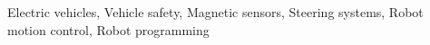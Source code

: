 \begin{keywords}
Electric vehicles, Vehicle safety, Magnetic sensors, Steering systems, Robot motion control, Robot programming
\end{keywords}
\clearpage
\thispagestyle{empty}
\cleardoublepage
